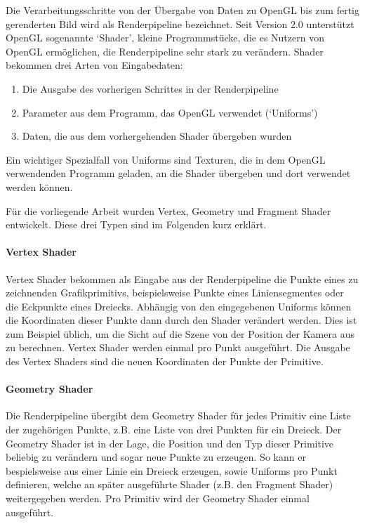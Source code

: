 \documentclass[a4paper,fontsize=12pt,toc=bib,halfparskip]{scrartcl}
\begin{document}
Die Verarbeitungsschritte von der \"Ubergabe von Daten zu OpenGL bis zum fertig gerenderten Bild wird als Renderpipeline bezeichnet. Seit Version 2.0 unterst\"utzt OpenGL sogenannte `Shader', kleine Programmst\"ucke, die es Nutzern von OpenGL erm\"oglichen, die Renderpipeline sehr stark zu ver\"andern. Shader bekommen drei Arten von Eingabedaten:

\begin{enumerate}
	\item Die Ausgabe des vorherigen Schrittes in der Renderpipeline
	\item Parameter aus dem Programm, das OpenGL verwendet (`Uniforms')
	\item Daten, die aus dem vorhergehenden Shader \"ubergeben wurden
\end{enumerate}

Ein wichtiger Spezialfall von Uniforms sind Texturen, die in dem OpenGL verwendenden Programm geladen, an die Shader \"ubergeben und dort verwendet werden k\"onnen.

F\"ur die vorliegende Arbeit wurden Vertex, Geometry und Fragment Shader entwickelt. Diese drei Typen sind im Folgenden kurz erkl\"art.

\paragraph{Vertex Shader}
Vertex Shader bekommen als Eingabe aus der Renderpipeline die Punkte eines zu zeichnenden Grafikprimitivs, beispielsweise Punkte eines Liniensegmentes oder die Eckpunkte eines Dreiecks. Abh\"angig von den eingegebenen Uniforms k\"onnen die Koordinaten dieser Punkte dann durch den Shader ver\"andert werden. Dies ist zum Beispiel \"ublich, um die Sicht auf die Szene von der Position der Kamera aus zu berechnen. Vertex Shader werden einmal pro Punkt ausgef\"uhrt. Die Ausgabe des Vertex Shaders sind die neuen Koordinaten der Punkte der Primitive.

\paragraph{Geometry Shader}
Die Renderpipeline \"ubergibt dem Geometry Shader f\"ur jedes Primitiv eine Liste der zugeh\"origen Punkte, z.B. eine Liste von drei Punkten f\"ur ein Dreieck. Der Geometry Shader ist in der Lage, die Position und den Typ dieser Primitive beliebig zu ver\"andern und sogar neue Punkte zu erzeugen. So kann er bespielsweise aus einer Linie ein Dreieck erzeugen, sowie Uniforms pro Punkt definieren, welche an sp\"ater ausgef\"uhrte Shader (z.B. den Fragment Shader) weitergegeben werden. Pro Primitiv wird der Geometry Shader einmal ausgef\"uhrt.
\end{document}
